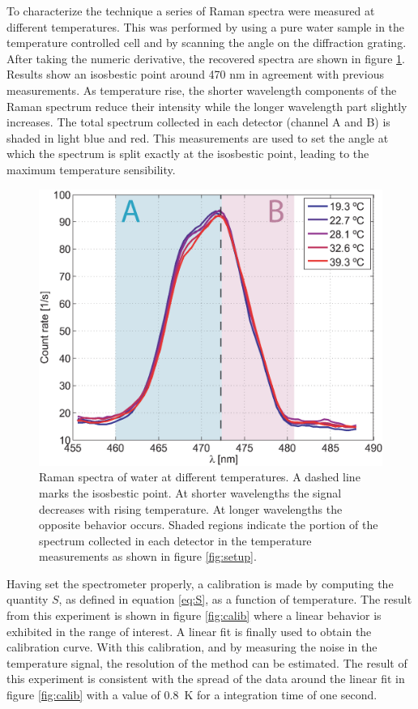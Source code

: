 \documentclass[twocolumn]{svjour3}       %
\begin{document}
To characterize the technique a series of Raman spectra were measured at different temperatures. This was performed by using a pure water sample in the temperature controlled cell and by scanning the angle on the diffraction grating. After taking the numeric derivative, the recovered spectra are shown in figure \ref{fig:spectra}. Results show an isosbestic point around 470 nm in agreement with previous measurements\cite{walrafen1}. As temperature rise, the shorter wavelength components of the Raman spectrum reduce their intensity while the longer wavelength part slightly increases. The total spectrum collected in each detector (channel A and B) is shaded in light blue and red. This measurements are used to set the angle at which the spectrum is split exactly at the isosbestic point, leading to the maximum temperature sensibility. 

\begin{figure}[h!]
\centering
\includegraphics[width=\columnwidth]{figs/spectra.eps}
\caption{Raman spectra of water at different temperatures. A dashed line marks the isosbestic point. At shorter wavelengths the signal decreases with rising temperature. At longer wavelengths the opposite behavior occurs. Shaded regions indicate the portion of the spectrum collected in each detector in the temperature measurements as shown in figure \ref{fig:setup}.\label{fig:spectra}}
\end{figure}

Having set the spectrometer properly, a calibration is made by computing the quantity $S$, as defined in equation \ref{eq:S}, as a function of temperature. The result from this experiment is shown in figure \ref{fig:calib} where a linear behavior is exhibited in the range of interest. A linear fit is finally used to obtain the calibration curve. With this calibration, and by measuring the noise in the temperature signal, the resolution of the method can be estimated. The result of this experiment is consistent with the spread of the data around the linear fit in figure \ref{fig:calib} with a value of 0.8~K for a integration time of one second.
\end{document}
